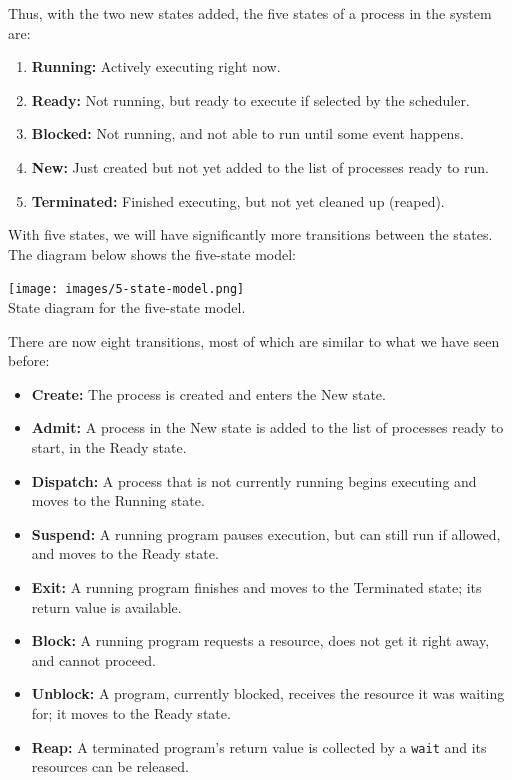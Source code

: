 Thus, with the two new states added, the five states of a process in the system are:

\begin{enumerate}
 \item \textbf{Running:} Actively executing right now.
 \item \textbf{Ready:} Not running, but ready to execute if selected by the scheduler.
 \item \textbf{Blocked:} Not running, and not able to run until some event happens.
 \item \textbf{New:} Just created but not yet added to the list of processes ready to run.
 \item \textbf{Terminated:} Finished executing, but not yet cleaned up (reaped).
\end{enumerate}

With five states, we will have significantly more transitions between the states. The diagram below shows the five-state model:

\begin{center}
\texttt{[image: images/5-state-model.png]}\\
State diagram for the five-state model.
\end{center}

There are now eight transitions, most of which are similar to what we have seen before:

\begin{itemize}
	\item \textbf{Create:} The process is created and enters the New state.
	\item \textbf{Admit:} A process in the New state is added to the list of processes ready to start, in the Ready state.
	\item \textbf{Dispatch:} A process that is not currently running begins executing and moves to the Running state.
	\item \textbf{Suspend:} A running program pauses execution, but can still run if allowed, and moves to the Ready state.
	\item \textbf{Exit:} A running program finishes and moves to the Terminated state; its return value is available.
	\item \textbf{Block:} A running program requests a resource, does not get it right away, and cannot proceed.
	\item \textbf{Unblock:} A program, currently blocked, receives the resource it was waiting for; it moves to the Ready state.
	\item \textbf{Reap:} A terminated program's return value is collected by a \texttt{wait} and its resources can be released.
\end{itemize}

